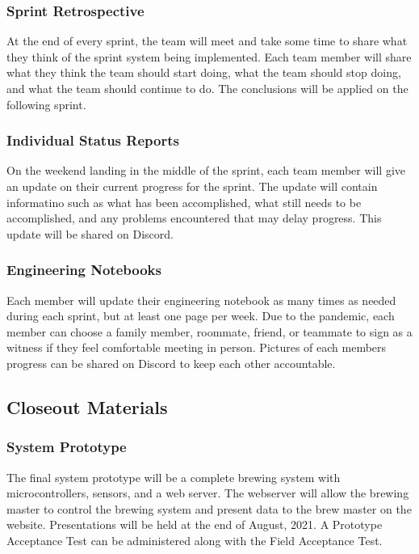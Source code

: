 \subsubsection{Sprint Retrospective}

At the end of every sprint, the team will meet and take some time to share what they think of the sprint system being implemented. Each team member will share what they think the team should start doing, what the team should stop doing, and what the team should continue to do. The conclusions will be applied on the following sprint.

\subsubsection{Individual Status Reports}

On the weekend landing in the middle of the sprint, each team member will give an update on their current progress for the sprint. The update will contain informatino such as what has been accomplished, what still needs to be accomplished, and any problems encountered that may delay progress. This update will be shared on Discord.

\subsubsection{Engineering Notebooks}

Each member will update their engineering notebook as many times as needed during each sprint, but at least one page per week. Due to the pandemic, each member can choose a family member, roommate, friend, or teammate to sign as a witness if they feel comfortable meeting in person. Pictures of each members progress can be shared on Discord to keep each other accountable.

\subsection{Closeout Materials}

\subsubsection{System Prototype}

The final system prototype will be a complete brewing system with microcontrollers, sensors, and a web server. The webserver will allow the brewing master to control the brewing system and present data to the brew master on the website. Presentations will be held at the end of August, 2021. A Prototype Acceptance Test can be administered along with the Field Acceptance Test.

